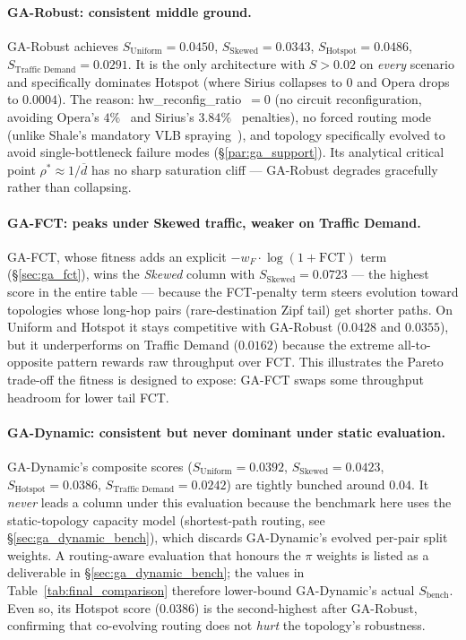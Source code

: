 \documentclass{article}
\begin{document}
    \paragraph{GA-Robust: consistent middle ground.}
    GA-Robust achieves $S_{\text{Uniform}}=0.0450$, $S_{\text{Skewed}}=0.0343$, $S_{\text{Hotspot}}=0.0486$, $S_{\text{Traffic Demand}}=0.0291$.  It is the only architecture with $S > 0.02$ on \emph{every} scenario and specifically dominates Hotspot (where Sirius collapses to $0$ and Opera drops to $0.0004$).  The reason: hw\_reconfig\_ratio~$=0$ (no circuit reconfiguration, avoiding Opera's $4\%$~\cite{opera} and Sirius's $3.84\%$~\cite{sirius} penalties), no forced routing mode (unlike Shale's mandatory VLB spraying~\cite{shale}), and topology specifically evolved to avoid single-bottleneck failure modes (\S\ref{par:ga_support}).  Its analytical critical point $\rho^*\approx 1/\overline{d}$ has no sharp saturation cliff --- GA-Robust degrades gracefully rather than collapsing.

    \paragraph{GA-FCT: peaks under Skewed traffic, weaker on Traffic Demand.}
    GA-FCT, whose fitness adds an explicit $-w_F\cdot\log(1+\mathrm{FCT})$ term (\S\ref{sec:ga_fct}), wins the \emph{Skewed} column with $S_{\text{Skewed}} = 0.0723$ --- the highest score in the entire table --- because the FCT-penalty term steers evolution toward topologies whose long-hop pairs (rare-destination Zipf tail) get shorter paths.  On Uniform and Hotspot it stays competitive with GA-Robust ($0.0428$ and $0.0355$), but it underperforms on Traffic Demand ($0.0162$) because the extreme all-to-opposite pattern rewards raw throughput over FCT.  This illustrates the Pareto trade-off the fitness is designed to expose: GA-FCT swaps some throughput headroom for lower tail FCT.

    \paragraph{GA-Dynamic: consistent but never dominant under static evaluation.}
    GA-Dynamic's composite scores ($S_{\text{Uniform}}=0.0392$, $S_{\text{Skewed}}=0.0423$, $S_{\text{Hotspot}}=0.0386$, $S_{\text{Traffic Demand}}=0.0242$) are tightly bunched around $0.04$.  It \emph{never} leads a column under this evaluation because the benchmark here uses the static-topology capacity model (shortest-path routing, see \S\ref{sec:ga_dynamic_bench}), which discards GA-Dynamic's evolved per-pair split weights.  A routing-aware evaluation that honours the $\pi$ weights is listed as a deliverable in \S\ref{sec:ga_dynamic_bench}; the values in Table~\ref{tab:final_comparison} therefore lower-bound GA-Dynamic's actual $S_{\text{bench}}$.  Even so, its Hotspot score ($0.0386$) is the second-highest after GA-Robust, confirming that co-evolving routing does not \emph{hurt} the topology's robustness.
\end{document}
